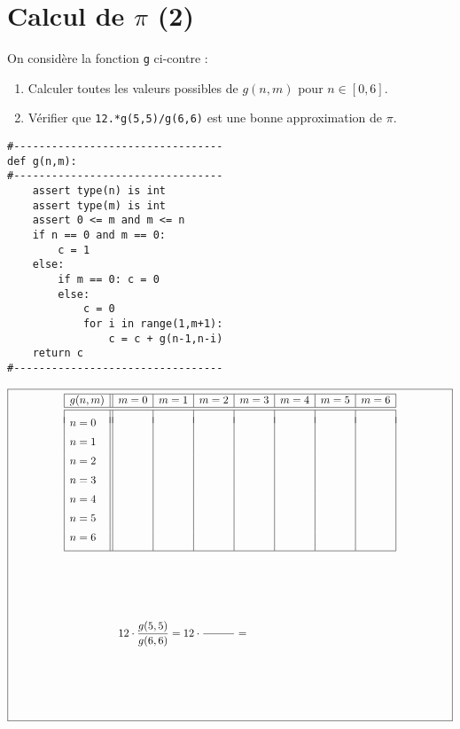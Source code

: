 \documentclass[11pt,a4paper]{article}
\begin{document}
\section{Calcul de $\pi$ (2)}
\begin{minipage}[t]{7cm}
On consid\`ere la fonction {\tt g} ci-contre :
\begin{enumerate}
\item Calculer toutes les valeurs possibles
	de $g(n,m)$ pour $n \in [0,6]$.
\item Vérifier que {\tt 12.*g(5,5)/g(6,6)} est une bonne approximation de
	$\pi$.
\end{enumerate}
\end{minipage}
\hfill
\begin{minipage}[t]{7cm}\footnotesize
\begin{verbatim}
#---------------------------------
def g(n,m):
#---------------------------------
    assert type(n) is int
    assert type(m) is int
    assert 0 <= m and m <= n
    if n == 0 and m == 0:
        c = 1
    else:
        if m == 0: c = 0
        else:
            c = 0
            for i in range(1,m+1):
                c = c + g(n-1,n-i)
    return c
#---------------------------------
\end{verbatim}
\end{minipage}


$$\framebox[14.5cm]{\begin{minipage}{14cm}
$$\begin{array}{|l||l|l|l|l|l|l|l|}
\hline
g(n,m)& m = 0 & m = 1 & m = 2 & m = 3 & m = 4 & m = 5 & m = 6 \\
\hline
\hline
      & & & & & & & \\[-2mm]
n = 0 & & & & & & & \\[2mm]
n = 1 & & & & & & & \\[2mm]
n = 2 & & & & & & & \\[2mm]
n = 3 & & & & & & & \\[2mm]
n = 4 & & & & & & & \\[2mm]
n = 5 & & & & & & & \\[2mm]
n = 6 & & & & & & & \\[2mm]
\hline
\end{array}$$
\vspace*{2cm}

$$ 12\cdot\frac{g(5,5)}{g(6,6)} = 12\cdot\frac{\makebox[1cm]{}}{\makebox[1cm]{}} = \makebox[3cm]{}$$
\vspace*{2cm}

\end{minipage}}$$

\label{fini}
\end{document}
